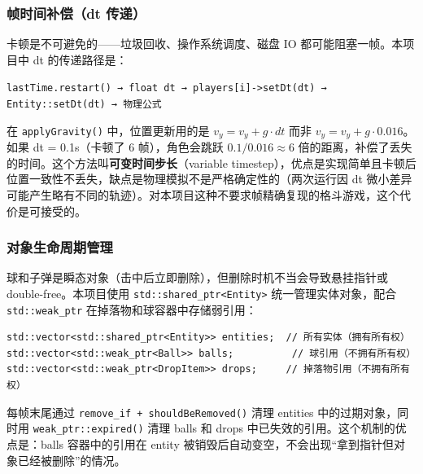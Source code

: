 \documentclass[utf8]{ctexart}
\begin{document}
\subsubsection{帧时间补偿（dt 传递）}

卡顿是不可避免的——垃圾回收、操作系统调度、磁盘 IO 都可能阻塞一帧。本项目中 dt 的传递路径是：

\begin{center}
\texttt{lastTime.restart() → float dt → players[i]->setDt(dt) → Entity::setDt(dt) → 物理公式}
\end{center}

在 \texttt{applyGravity()} 中，位置更新用的是 $v_y = v_y + g \cdot dt$ 而非 $v_y = v_y + g \cdot 0.016$。如果 dt = 0.1s（卡顿了 6 帧），角色会跳跃 $0.1 / 0.016 \approx 6$ 倍的距离，补偿了丢失的时间。这个方法叫\textbf{可变时间步长}（variable timestep），优点是实现简单且卡顿后位置一致性不丢失，缺点是物理模拟不是严格确定性的（两次运行因 dt 微小差异可能产生略有不同的轨迹）。对本项目这种不要求帧精确复现的格斗游戏，这个代价是可接受的。

\subsubsection{对象生命周期管理}

球和子弹是瞬态对象（击中后立即删除），但删除时机不当会导致悬挂指针或 double-free。本项目使用 \texttt{std::shared\_ptr<Entity>} 统一管理实体对象，配合 \texttt{std::weak\_ptr} 在掉落物和球容器中存储弱引用：

\begin{verbatim}
std::vector<std::shared_ptr<Entity>> entities;  // 所有实体（拥有所有权）
std::vector<std::weak_ptr<Ball>> balls;          // 球引用（不拥有所有权）
std::vector<std::weak_ptr<DropItem>> drops;     // 掉落物引用（不拥有所有权）
\end{verbatim}

每帧末尾通过 \texttt{remove\_if + shouldBeRemoved()} 清理 entities 中的过期对象，同时用 \texttt{weak\_ptr::expired()} 清理 balls 和 drops 中已失效的引用。这个机制的优点是：balls 容器中的引用在 entity 被销毁后自动变空，不会出现“拿到指针但对象已经被删除”的情况。
\end{document}

